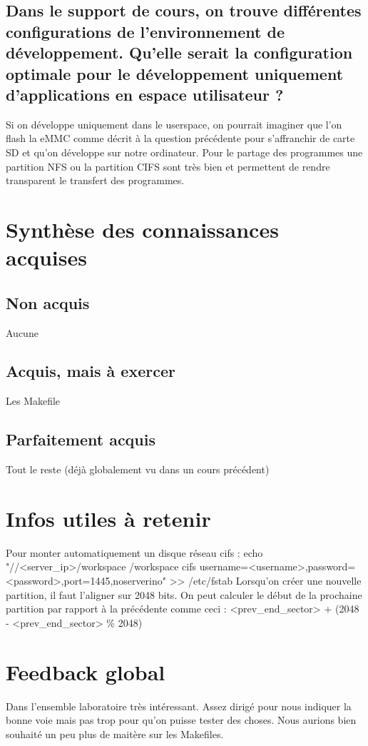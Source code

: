 \documentclass{ReportTemplate}
\begin{document}
\subsection{Dans le support de cours, on trouve différentes configurations de l’environnement de développement. Qu’elle serait la configuration optimale pour le développement uniquement d’applications en espace utilisateur ?}
Si on développe uniquement dans le userspace, on pourrait imaginer que l'on flash la eMMC comme décrit à la question précédente pour s'affranchir de carte SD et qu'on développe sur notre ordinateur.
Pour le partage des programmes une partition NFS ou la partition CIFS sont très bien et permettent de rendre transparent le transfert des programmes.

\section{Synthèse des connaissances acquises}
\subsection{Non acquis}
Aucune
\subsection{Acquis, mais à exercer}
Les Makefile
\subsection{Parfaitement acquis}
Tout le reste (déjà globalement vu dans un cours précédent)
\section{Infos utiles à retenir}
Pour monter automatiquement un disque réseau cifs : \newline
echo "//<server\_ip>/workspace /workspace cifs username=<username>,\newline password=<password>,port=1445,noserverino" >> /etc/fstab \newline
Lorsqu'on créer une nouvelle partition, il faut l'aligner sur 2048 bits. On peut calculer le début de la prochaine partition par rapport à la précédente comme ceci : \newline
<prev\_end\_sector> + (2048 - <prev\_end\_sector>  \% 2048)\newline
\section{Feedback global}
Dans l'ensemble laboratoire très intéressant. Assez dirigé pour nous indiquer la bonne voie mais pas trop pour qu'on puisse tester des choses.
Nous aurions bien souhaité un peu plus de maitère sur les Makefiles.
\end{document}
